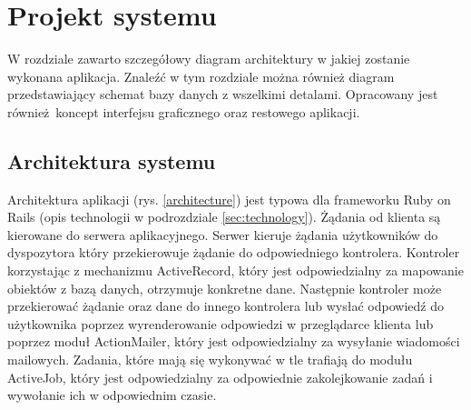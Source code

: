 \chapter{Projekt systemu}
\label{cha:analizaAplikacji}

W rozdziale zawarto szczegółowy diagram architektury w jakiej zostanie wykonana aplikacja. Znaleźć w tym rozdziale można również diagram przedstawiający schemat bazy danych z wszelkimi detalami. Opracowany jest również koncept interfejsu graficznego oraz restowego aplikacji. 

\section{Architektura systemu}
\label{sec:architektura}

Architektura aplikacji (rys. \ref{architecture}) jest typowa dla frameworku Ruby on Rails (opis technologii w podrozdziale \ref{sec:technology}). Żądania od klienta są kierowane do serwera aplikacyjnego. Serwer kieruje żądania użytkowników do dyspozytora który przekierowuje żądanie do odpowiedniego kontrolera. Kontroler korzystając z mechanizmu ActiveRecord, który jest odpowiedzialny za mapowanie obiektów z bazą danych, otrzymuje konkretne dane. Następnie kontroler może przekierować żądanie oraz dane do innego kontrolera lub wysłać odpowiedź do użytkownika poprzez wyrenderowanie odpowiedzi w przeglądarce klienta lub poprzez moduł ActionMailer, który jest odpowiedzialny za wysyłanie wiadomości mailowych. Zadania, które mają się wykonywać w tle trafiają do modułu ActiveJob, który jest odpowiedzialny za odpowiednie zakolejkowanie zadań i wywołanie ich w odpowiednim czasie.\cite{rails_guide}
\noindent
\begin{minipage}{\linewidth}
\label{architecture}
\end{minipage}

